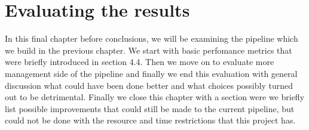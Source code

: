 \chapter{Evaluating the results}
\label{chapter:evaluation}





In this final chapter before conclusions, we will be examining the pipeline which we build in the previous chapter.
We start with basic perfomance metrics that were briefly introduced in section 4.4.
Then we move on to evaluate more management side of the pipeline and finally we end this evaluation with general discussion what could have been done better and what choices possibly turned out to be detrimental.
Finally we close this chapter with a section were we briefly list possible improvements that could still be made to the current pipeline, but could not be done with the resource and time restrictions that this project has.


